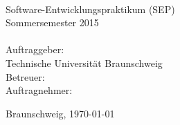 \begin{titlepage}
\begin{center}
{}\\[4ex]

Software-Entwicklungspraktikum (SEP)\\
Sommersemester 2015\\[4ex]

{}\\[2ex]

Auftraggeber:\\
Technische Universität Braunschweig\\
\institut[2ex]
Betreuer: \betreuer\\[2ex]

Auftragnehmer:\


\vfill
Braunschweig, \today

\end{center}
\end{titlepage}
